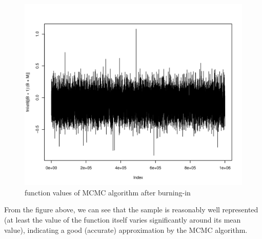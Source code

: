 \begin{figure}[H]
  \centering
\begin{knitrout}
\color{fgcolor}\begin{kframe}
\begin{alltt}
 \hlkwb{=} 
\hlstd{(fnlist6[(B}\hlopt{+}\hlstd{)}\hlopt{:}\hlopt{+}\hlstd{M)],}\hlstd{=}\hlstd{)}
\end{alltt}
\end{kframe}
\includegraphics[width=\maxwidth]{figure/p6plot-1} 

\end{knitrout}
		\caption{function values of MCMC algorithm after burning-in}
\end{figure}

From the figure above, we can see that the sample is reasonably well represented (at least the value of the function itself varies significantly around its mean value), indicating a good (accurate) approximation by the MCMC algorithm.
